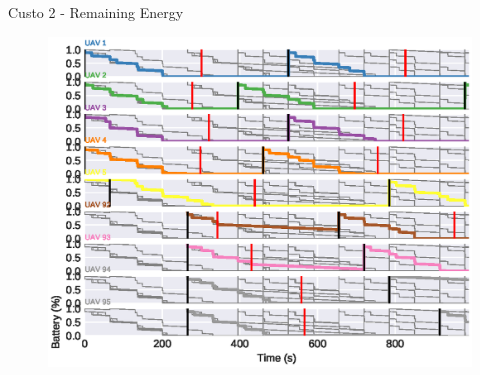 \begin{frame}{Custo 2 - Remaining Energy}
            \begin{figure}[!htb]
                    \includegraphics[width=\textwidth]{custo_2/uav_remaining_energy_all.eps}
                \end{figure}
        \end{frame}